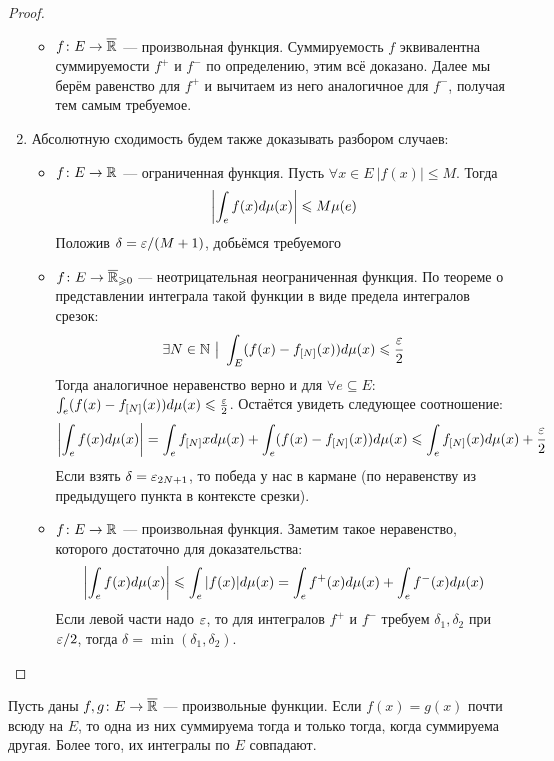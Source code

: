 \begin{proof}
\begin{enumerate}
\begin{itemize}
			\item $f \colon E \to \overline{\mathbb{R}}$ --- произвольная функция. Суммируемость $f$ эквивалентна суммируемости $f^+$ и $f^-$ по определению, этим всё доказано. Далее мы берём равенство для $f^+$ и вычитаем из него аналогичное для $f^-$, получая тем самым требуемое.
		\end{itemize}
	
		\item Абсолютную сходимость будем также доказывать разбором случаев:
		\begin{itemize}
			\item $f \colon E \to \mathbb{R}$ --- ограниченная функция. Пусть $\forall x \in E\ |f(x)| \le M$. Тогда
			\[
				\left|\int_e f(x)d\mu(x)\right| \leqslant M\mu(e)
			\]
			Положив $\delta = \varepsilon / (M + 1)$, добьёмся требуемого
			
			\item $f \colon E \to \overline{\mathbb{R}}_{\geqslant 0}$ --- неотрицательная неограниченная функция. По теореме о представлении интеграла такой функции в виде предела интегралов срезок:
			\[
				\exists N \in \mathbb{N} \ \big|\  \int_E (f(x) - f_{[N]}(x))d\mu(x) \leqslant \frac{\varepsilon}{2}
			\]
			Тогда аналогичное неравенство верно и для $\forall e \subseteq E$: $\int_e (f(x) - f_{[N]}(x))d\mu(x) \leqslant \frac{\varepsilon}{2}$. Остаётся увидеть следующее соотношение:
			\[
				\left|\int_e f(x)d\mu(x)\right| = \int_e f_{[N]}xd\mu(x) + \int_e (f(x) - f_{[N]}(x))d\mu(x) \leqslant \int_e f_{[N]}(x)d\mu(x) + \frac{\varepsilon}{2}
			\]
			Если взять $\delta = \varepsilon_{2N + 1}$, то победа у нас в кармане (по неравенству из предыдущего пункта в контексте срезки).
			
			\item $f \colon E \to \mathbb{R}$ --- произвольная функция. Заметим такое неравенство, которого достаточно для доказательства:
			\[
				\left|\int_e f(x)d\mu(x)\right| \leqslant \int_e |f(x)|d\mu(x) = \int_e f^+(x)d\mu(x) + \int_e f^-(x)d\mu(x)
			\]
			Если левой части надо $\varepsilon$, то для интегралов $f^+$ и $f^-$ требуем $\delta_1, \delta_2$ при $\varepsilon / 2$, тогда $\delta = \min(\delta_1, \delta_2)$.
		\end{itemize}
	\end{enumerate}
\end{proof}

\begin{corollary}
	Пусть даны $f, g \colon E \to \overline{\mathbb{R}}$ --- произвольные функции. Если $f(x) = g(x)$ почти всюду на $E$, то одна из них суммируема тогда и только тогда, когда суммируема другая. Более того, их интегралы по $E$ совпадают.
\end{corollary}

